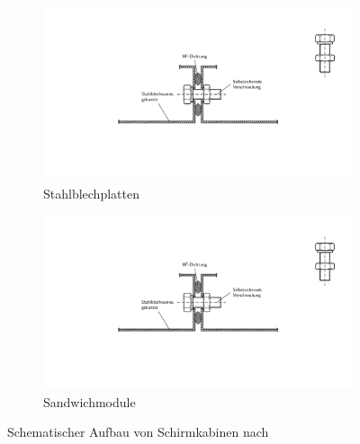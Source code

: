 \begin{figure}[H]
    \centering
    \begin{subfigure}[b]{0.4\textwidth}
        \includegraphics[page = 2, height=0.145\textheight,trim = 8.5cm 5.5cm 8.5cm 4.5cm, clip]{Abbildungen/Kapitel3/Schirmkabinen.pdf}
        \caption{Stahlblechplatten\label{subfig:3_Aufbau_Stahlblechkabine}}
    \end{subfigure}
    \hspace{1cm}
    \begin{subfigure}[b]{0.5\textwidth}
        \includegraphics[page = 3, height=0.135\textheight, trim = 11.5cm 6.5cm 7cm 6cm, clip]{Abbildungen/Kapitel3/Schirmkabinen.pdf}
        \caption{Sandwichmodule\label{subfig:3_Aufbau_Sandwichkabine}}
    \end{subfigure}
    \caption[Schematischer Aufbau von Schirmkabinen]{Schematischer Aufbau von Schirmkabinen nach~\cite{EMC-Technik_Stahlblechplatten, EMC-Technik_Sandwichmodul, EM_Schirmung, Design_of_shielded_enclosures}}
    \label{fig:3_Allgemeiner_Aufbau_Schirmkabinen}
\end{figure}

